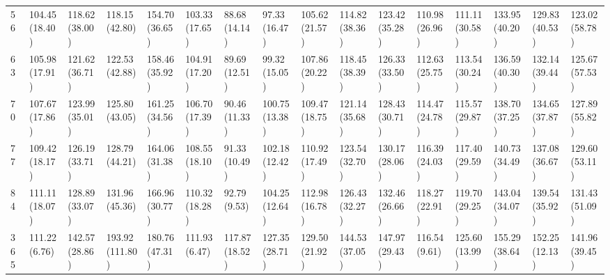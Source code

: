 \begin{tabular}{llllllllllllllll}
56  &  104.45 (18.40) &  118.62 (38.00) &   118.15 (42.80) &  154.70 (36.65) &  103.33 (17.65) &   88.68 (14.14) &   97.33 (16.47) &  105.62 (21.57) &  114.82 (38.36) &  123.42 (35.28) &  110.98 (26.96) &  111.11 (30.58) &  133.95 (40.20) &  129.83 (40.53) &  123.02 (58.78) \\
63  &  105.98 (17.91) &  121.62 (36.71) &   122.53 (42.88) &  158.46 (35.92) &  104.91 (17.20) &   89.69 (12.51) &   99.32 (15.05) &  107.86 (20.22) &  118.45 (38.39) &  126.33 (33.50) &  112.63 (25.75) &  113.54 (30.24) &  136.59 (40.30) &  132.14 (39.44) &  125.67 (57.53) \\
70  &  107.67 (17.86) &  123.99 (35.01) &   125.80 (43.05) &  161.25 (34.56) &  106.70 (17.39) &   90.46 (11.33) &  100.75 (13.38) &  109.47 (18.75) &  121.14 (35.68) &  128.43 (30.71) &  114.47 (24.78) &  115.57 (29.87) &  138.70 (37.25) &  134.65 (37.87) &  127.89 (55.82) \\
77  &  109.42 (18.17) &  126.19 (33.71) &   128.79 (44.21) &  164.06 (31.38) &  108.55 (18.10) &   91.33 (10.49) &  102.18 (12.42) &  110.92 (17.49) &  123.54 (32.70) &  130.17 (28.06) &  116.39 (24.03) &  117.40 (29.59) &  140.73 (34.49) &  137.08 (36.67) &  129.60 (53.11) \\
84  &  111.11 (18.07) &  128.89 (33.07) &   131.96 (45.36) &  166.96 (30.77) &  110.32 (18.28) &    92.79 (9.53) &  104.25 (12.64) &  112.98 (16.78) &  126.43 (32.27) &  132.46 (26.66) &  118.27 (22.91) &  119.70 (29.25) &  143.04 (34.07) &  139.54 (35.92) &  131.43 (51.09) \\
365 &   111.22 (6.76) &  142.57 (28.86) &  193.92 (111.80) &  180.76 (47.31) &   111.93 (6.47) &  117.87 (18.52) &  127.35 (28.71) &  129.50 (21.92) &  144.53 (37.05) &  147.97 (29.43) &   116.54 (9.61) &  125.60 (13.99) &  155.29 (38.64) &  152.25 (12.13) &  141.96 (39.45) \\
\bottomrule
\end{tabular}
